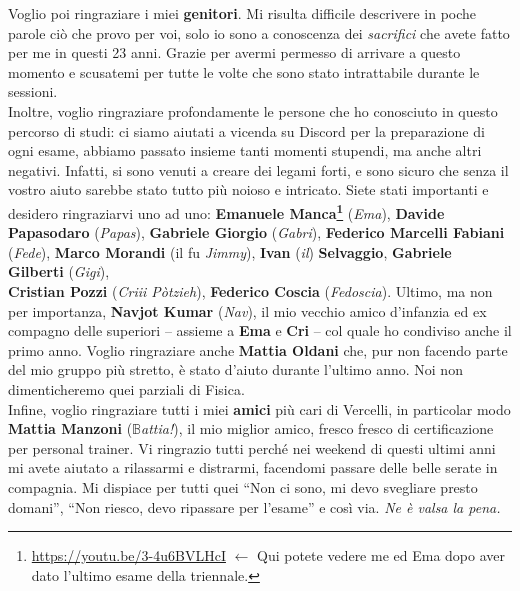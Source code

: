 \noindent Voglio poi ringraziare i miei \textbf{genitori}.
Mi risulta difficile descrivere in poche parole ciò che provo per voi, solo io sono a conoscenza dei \textit{sacrifici} che avete fatto per me in questi 23 anni.
Grazie per avermi permesso di arrivare a questo momento e scusatemi per tutte le volte che sono stato intrattabile durante le sessioni. \\

\noindent Inoltre, voglio ringraziare profondamente le persone che ho conosciuto in questo percorso
di studi: ci siamo aiutati a vicenda su Discord per la preparazione di ogni esame, abbiamo passato
insieme tanti momenti stupendi, ma anche altri negativi. Infatti, si sono venuti a creare dei legami
forti, e sono sicuro che senza il vostro aiuto sarebbe stato tutto più noioso e intricato.
Siete stati importanti e desidero ringraziarvi uno ad uno: \textbf{Emanuele 
Manca\footnote{\href{https://youtu.be/3-4u6BVLHcI}{https://youtu.be/3-4u6BVLHcI} $\leftarrow$ Qui potete vedere me ed Ema dopo aver dato l'ultimo esame della triennale.}} (\textit{Ema}),
\textbf{Davide Papasodaro} (\textit{Papas}), \textbf{Gabriele Giorgio} (\textit{Gabri}), 
\textbf{Federico Marcelli Fabiani} (\textit{Fede}), \textbf{Marco Morandi} (il fu \textit{Jimmy}), 
\textbf{Ivan} (\textit{il}) \textbf{Selvaggio}, \textbf{Gabriele Gilberti} (\textit{Gigi}),\\
\textbf{Cristian Pozzi} (\textit{Criii Pòtzieh}), \textbf{Federico Coscia} (\textit{Fedoscia}). 
Ultimo, ma non per importanza, \textbf{Navjot Kumar} (\textit{Nav}), il mio vecchio amico d'infanzia ed 
ex compagno delle superiori -- assieme a \textbf{Ema} e \textbf{Cri} -- col quale ho condiviso anche il primo anno.
Voglio ringraziare anche \textbf{Mattia Oldani} che, pur non facendo parte del mio gruppo più stretto, è
stato d'aiuto durante l'ultimo anno. Noi non dimenticheremo quei parziali di Fisica.\\

\noindent Infine, voglio ringraziare tutti i miei \textbf{amici} più cari di Vercelli, in particolar modo 
\textbf{Mattia Manzoni} (\textit{{\Huge $\mathbb{B}$}attia!}), il mio miglior amico, fresco fresco di 
certificazione per personal trainer. Vi ringrazio tutti perché nei weekend di questi ultimi anni mi avete 
aiutato a rilassarmi e distrarmi, facendomi passare delle belle serate in compagnia. 
Mi dispiace per tutti quei ``Non ci sono, mi devo svegliare presto domani'', ``Non riesco, devo ripassare per l'esame'' e così via.
\vskip 1cm
\raggedleft \textit{Ne è valsa la pena.}